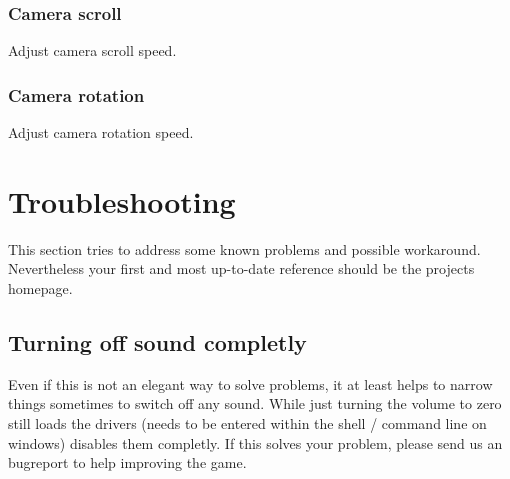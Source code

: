 \subsubsection*{Camera scroll}
Adjust camera scroll speed.
\subsubsection*{Camera rotation}
Adjust camera rotation speed.

\section{Troubleshooting}
This section tries to address some known problems and possible workaround. Nevertheless your first and most up-to-date reference should be the projects homepage.

\subsection{Turning off sound completly}
Even if this is not an elegant way to solve problems, it at least helps to narrow things sometimes to switch off any sound. While just turning the volume to zero still loads the drivers  (needs to be entered within the shell / command line on windows) disables them completly. If this solves your problem, please send us an bugreport to help improving the game.
